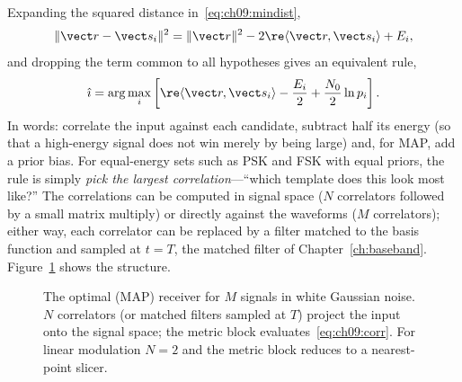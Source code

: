 Expanding the squared distance in~\eqref{eq:ch09:mindist},
\begin{equation}
\|\vect r-\vect s_i\|^2=\|\vect r\|^2-2\re\langle\vect r,\vect s_i\rangle+E_i ,
\end{equation}
and dropping the term common to all hypotheses gives an equivalent rule,
\begin{equation}
\hat\imath=\arg\max_i\left[\re\langle\vect r,\vect s_i\rangle-\frac{E_i}{2}+\frac{N_0}{2}\ln p_i\right].
\label{eq:ch09:corr}
\end{equation}
In words: correlate the input against each candidate, subtract half its energy (so that a
high-energy signal does not win merely by being large) and, for MAP, add a prior bias. For
equal-energy sets such as PSK and FSK with equal priors, the rule is simply \emph{pick the largest
correlation}---``which template does this look most like?'' The correlations can be computed in
signal space ($N$ correlators followed by a small matrix multiply) or directly against the
waveforms ($M$ correlators); either way, each correlator can be replaced by a filter matched to
the basis function and sampled at $t=T$, the matched filter of Chapter~\ref{ch:baseband}.
Figure~\ref{fig:ch09_correlator} shows the structure.

\begin{figure}[htbp]
\centering
{}
\caption{The optimal (MAP) receiver for $M$ signals in white Gaussian noise. $N$ correlators (or
matched filters sampled at $T$) project the input onto the signal space; the metric block
evaluates~\eqref{eq:ch09:corr}. For linear modulation $N=2$ and the metric block reduces to a
nearest-point slicer.}
\label{fig:ch09_correlator}
\end{figure}

